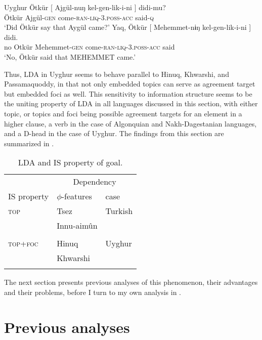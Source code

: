 \documentclass[output=paper
,modfonts
,nonflat]{langsci/langscibook}
\begin{document}
\begin{exe}
\ex Uyghur \citep[][10]{Asarina_Hartman2011a}
	\xlist
		\gll Ötkür [ Ajgül-nuŋ kel-gen-lik-i-ni ] didi-mu?\\
			 Ötkür {} Ajgül-\textsc{gen} come-\textsc{ran-liq-3.poss-acc} {} said-\textsc{q}\\
		\glt `Did Ötkür say that Aygül came?'
	 \label{ex:uyg_cf}
		\gll Yaq, Ötkür [ Mehemmet-nɨŋ kel-gen-lik-i-ni ] didi.\\
			 no Otkür {} Mehemmet-\textsc{gen} come-\textsc{ran-liq-3.poss-acc} {} said\\
		\glt `No, Ötkür said that MEHEMMET came.'
	\endxlist
\end{exe}
Thus, LDA in Uyghur seems to behave parallel to Hinuq, Khwarshi, and Passamaquoddy, in that not only embedded topics can serve as agreement target but embedded foci as well. This sensitivity to information structure seems to be the uniting property of LDA in all languages discussed in this section, with either topic, or topics and foci being possible agreement targets for an element in a higher clause, a verb in the case of Algonquian and Nakh-Dagestanian languages, and a D-head in the case of Uyghur. The findings from this section are summarized in .
\begin{table}
	\caption{LDA and IS property of goal.\label{table:LDA}}
	\begin{tabular}{lll} 
		\lsptoprule
			& \multicolumn{2}{c}{Dependency} \\
		\cmidrule(r){2-3}
		{IS property}    & {$ \phi $-features} & {case}\\
		\midrule
		{\textsc{top}}      & Tsez \citep{Polinsky_Potsdam2001} & Turkish \citep{Sener2008} \\
			& Innu-aim\^{u}n  & \\
			& \citep{Branigan_MacKenzie2002} & \\
		{\textsc{top+foc}} & Hinuq \citep{Forker2012}     & Uyghur \\
			& Khwarshi \citep{Khalilova2009}   & \citep{Asarina_Hartman2011a}\\
		\lspbottomrule
	\end{tabular}
\end{table}

{\noindent}The next section presents previous analyses of this phenomenon, their advantages and their problems, before I turn to my own analysis in .

\section{Previous analyses}\label{sec:mursell:3}\largerpage
\end{document}
